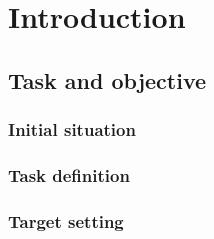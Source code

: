 \chapter{Introduction}
\label{ch:Introduction}

\section{Task and objective}
\label{sec:Task-Objective}

\subsection{Initial situation}
\label{sub:Initial-Stituation}

\subsection{Task definition}
\label{sub:Task-Definition}

\subsection{Target setting}
\label{sub:Target-Setting}